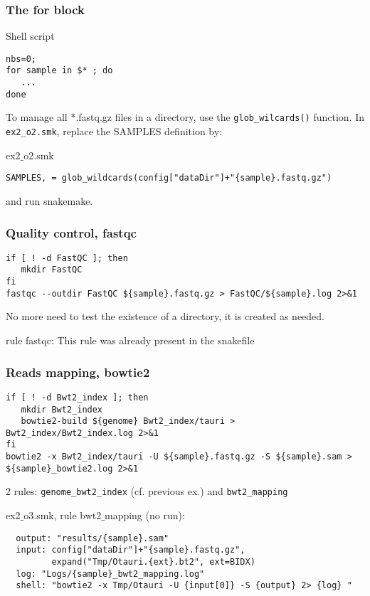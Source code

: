\begin{frame}[containsverbatim]
\frametitle{The for block}
\begin{exampleblock}{Shell script}
\begin{lstlisting}
nbs=0;
for sample in $* ; do 
   ...
done
\end{lstlisting}
\end{exampleblock}
To manage all *.fastq.gz files in a directory, use the \verb|glob_wilcards()| function. In \verb|ex2_o2.smk|, replace the SAMPLES definition by:
\begin{exampleblock}{ex2$\_$o2.smk}
\begin{lstlisting}
SAMPLES, = glob_wildcards(config["dataDir"]+"{sample}.fastq.gz")
\end{lstlisting}
\end{exampleblock}
and run snakemake.
\end{frame}
\begin{frame}[containsverbatim]
\frametitle{Quality control, fastqc}
\begin{exampleblock}{}
\begin{lstlisting}
if [ ! -d FastQC ]; then
   mkdir FastQC
fi
fastqc --outdir FastQC ${sample}.fastq.gz > FastQC/${sample}.log 2>&1
\end{lstlisting}
\end{exampleblock}
No more need to test the existence of a directory, it is created as needed.
\begin{exampleblock}{rule fastqc:}
This rule was already present in the snakefile
\end{exampleblock}
\end{frame}
\begin{frame}[containsverbatim]
\frametitle{Reads mapping, bowtie2}
\begin{exampleblock}{}
\begin{lstlisting}
if [ ! -d Bwt2_index ]; then
   mkdir Bwt2_index
   bowtie2-build ${genome} Bwt2_index/tauri > Bwt2_index/Bwt2_index.log 2>&1
fi
bowtie2 -x Bwt2_index/tauri -U ${sample}.fastq.gz -S ${sample}.sam > ${sample}_bowtie2.log 2>&1
\end{lstlisting}
\end{exampleblock}
2 rules: \verb|genome_bwt2_index| (cf. previous ex.) and \verb|bwt2_mapping|
\begin{exampleblock}{ex2$\_$o3.smk, rule bwt2$\_$mapping (no run):}
\begin{lstlisting}
  output: "results/{sample}.sam"
  input: config["dataDir"]+"{sample}.fastq.gz",
         expand("Tmp/Otauri.{ext}.bt2", ext=BIDX)
  log: "Logs/{sample}_bwt2_mapping.log"
  shell: "bowtie2 -x Tmp/Otauri -U {input[0]} -S {output} 2> {log} "
\end{lstlisting}
\end{exampleblock}
\end{frame}
